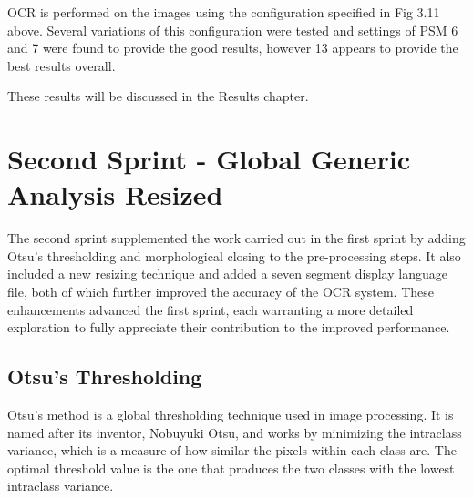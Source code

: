 OCR is performed on the images using the configuration specified in Fig 3.11 above. Several variations of this configuration were tested and settings of PSM 6 and 7 were found to provide the good results, however 13 appears to provide the best results overall.

These results will be discussed in the Results chapter.

\newpage

\section{Second Sprint - Global Generic Analysis Resized}

The second sprint supplemented the work carried out in the first sprint by adding Otsu's thresholding and morphological closing to the pre-processing steps. It also included a new resizing technique and added a seven segment display language file, both of which further improved the accuracy of the OCR system. These enhancements advanced the first sprint, each warranting a more detailed exploration to fully appreciate their contribution to the improved performance.

\subsection{Otsu's Thresholding}

Otsu's method is a global thresholding technique used in image processing. It is named after its inventor, Nobuyuki Otsu, and works by minimizing the intraclass variance, which is a measure of how similar the pixels within each class are. The optimal threshold value is the one that produces the two classes with the lowest intraclass variance. \cite{garciaDetectionClassificationPathogens2021}

